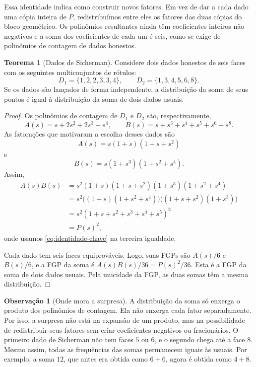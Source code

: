 \documentclass[12pt,portuguese]{article}
\theoremstyle{definition}
\newtheorem{theorem}{Teorema}
\newtheorem{remark}[remark]{Observação}
\theoremstyle{plainexercise}
\theoremstyle{starredexercise}
\theoremstyle{definition}
\begin{document}
Essa identidade indica como construir novos fatores.
Em vez de dar a cada dado uma cópia inteira de $P$,
redistribuímos entre eles os fatores das duas cópias do bloco geométrico.
Os polinômios resultantes ainda têm coeficientes inteiros não negativos
e a soma dos coeficientes de cada um é seis,
como se exige de polinômios de contagem de dados honestos.

\begin{theorem}[Dados de Sicherman]\label{thm:sicherman}
Considere dois dados honestos de seis faces com os seguintes multiconjuntos
de rótulos:
\[
D_1=\{1,2,2,3,3,4\},
\qquad
D_2=\{1,3,4,5,6,8\}.
\]
Se os dados são lançados de forma independente,
a distribuição da soma de seus pontos é igual à distribuição da soma de
dois dados usuais.
\end{theorem}

\begin{proof}
Os polinômios de contagem de $D_1$ e $D_2$ são, respectivamente,
\begin{equation}\label{eq:pol-sicherman}
A(s)=s+2s^2+2s^3+s^4,
\qquad
B(s)=s+s^3+s^4+s^5+s^6+s^8.
\end{equation}
As fatorações que motivaram a escolha desses dados são
\[
A(s)=s(1+s)(1+s+s^2)
\]
e
\[
B(s)=s(1+s^3)(1+s^2+s^4).
\]
Assim,
\begin{align*}
A(s)B(s)
&=s^2(1+s)(1+s+s^2)(1+s^3)(1+s^2+s^4)
\\[0.3cm]
&=s^2\bigl((1+s)(1+s^2+s^4)\bigr)
\bigl((1+s+s^2)(1+s^3)\bigr)
\\[0.3cm]
&=s^2(1+s+s^2+s^3+s^4+s^5)^2
\\[0.3cm]
&=P(s)^2,
\end{align*}
onde usamos \eqref{eq:identidade-chave} na terceira igualdade.

Cada dado tem seis faces equiprováveis.
Logo, suas FGPs são $A(s)/6$ e $B(s)/6$,
e a FGP da soma é $A(s)B(s)/36=P(s)^2/36$.
Esta é a FGP da soma de dois dados usuais.
Pela unicidade da FGP,
as duas somas têm a mesma distribuição.
\end{proof}

\begin{remark}[Onde mora a surpresa]\label{rem:onde-mora-surpresa}
A distribuição da soma só enxerga o produto dos polinômios de contagem.
Ela não enxerga cada fator separadamente.
Por isso, a surpresa não está na expansão de um produto,
mas na possibilidade de redistribuir seus fatores sem criar coeficientes
negativos ou fracionários.
O primeiro dado de Sicherman não tem faces $5$ ou $6$,
e o segundo chega até a face $8$.
Mesmo assim, todas as frequências das somas permanecem iguais às usuais.
Por exemplo, a soma $12$, que antes era obtida como $6+6$,
agora é obtida como $4+8$.
\end{remark}
\end{document}
